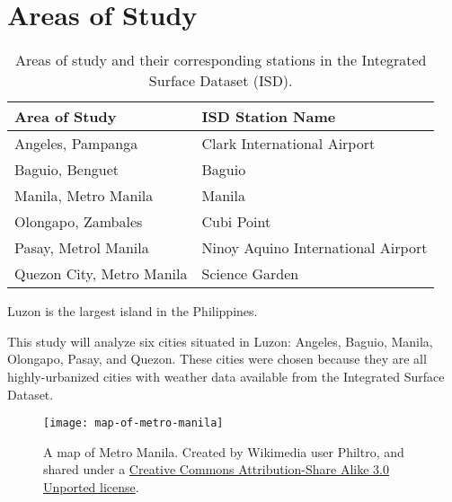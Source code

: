 \section{Areas of Study}
	\begin{table}	
		\caption{Areas of study and their corresponding stations in the Integrated Surface Dataset (ISD).}
		\label{tab:isd-stations}
		\centering
		\begin{tabular}{ll}
			\hline \hline
			Area of Study             & ISD Station Name                       \\
			\hline
			Angeles, Pampanga         & Clark International Airport        \\
			Baguio, Benguet           & Baguio                             \\
			Manila, Metro Manila      & Manila                             \\
			Olongapo, Zambales        & Cubi Point                         \\
			Pasay, Metrol Manila      & Ninoy Aquino International Airport \\
			Quezon City, Metro Manila & Science Garden \\                   
			\hline
		\end{tabular}	
	\end{table}
	
	Luzon is the largest island in the Philippines.
	
	This study will analyze six cities situated in Luzon:
		Angeles,
		Baguio,
		Manila,
		Olongapo,
		Pasay,
		and
		Quezon.
	These cities were chosen because they are all highly-urbanized cities with weather data available from the Integrated Surface Dataset.

	
	\begin{figure}
		\centering
		\texttt{[image: map-of-metro-manila]}
		\caption{
			A map of Metro Manila.
			Created by Wikimedia user Philtro, and shared under a
			\href{https://creativecommons.org/licenses/by-sa/3.0/deed.en}{Creative Commons Attribution-Share Alike 3.0 Unported license}.
		}
		\label{fig:map-of-metro-manila}
	\end{figure}	
		
